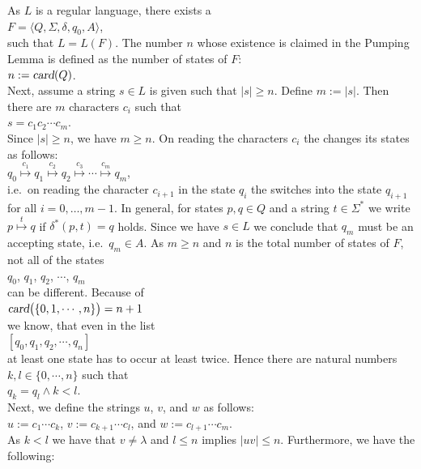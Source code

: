 \proofEng
As $L$ is a regular language, there exists a 
\\[0.2cm]
\hspace*{1.3cm}
$F = \langle Q, \Sigma, \delta, q_0, A \rangle$,
\\[0.2cm]
such that $L = L(F)$.  The number $n$ whose existence is claimed in the Pumping Lemma is defined as
the number of states of $F$: 
\\[0.2cm]
\hspace*{1.3cm}
$n := \textsl{card}(Q)$.
\\[0.2cm]
Next, assume a string $s \in L$ is given such that $|s| \geq n$.  Define $m := |s|$. Then there are $m$
characters $c_i$ such that
\\[0.2cm]
\hspace*{1.3cm}
$s = c_1 c_2 \cdots c_m$.
\\[0.2cm]
Since $|s| \geq n$, we have $m \geq n$.  On reading the characters $c_i$ the  changes its
states as follows:
\\[0.2cm]
\hspace*{1.3cm}
$q_0 \stackrel{c_1}{\longmapsto} q_1 \stackrel{c_2}{\longmapsto} q_2 \stackrel{c_3}{\longmapsto} \cdots \stackrel{c_m}{\longmapsto} q_m$,
\\[0.2cm]
i.e.~on reading the character $c_{i+1}$ in the state $q_i$ the  switches into the state $q_{i+1}$
for all $i=0,\ldots,m-1$.  In general, for states $p, q \in Q$ and a string $t \in \Sigma^*$ we write
$p \stackrel{t}{\longmapsto} q$ if $\delta^*(p, t) = q$ holds.
Since we have  $s \in L$ we conclude that  $q_m$ must be an accepting state, i.e.~$q_m \in A$.
As $m \geq n$ and $n$ is the total number of states of $F$, not all of the states 
\\[0.2cm]
\hspace*{1.3cm}
$q_0$, $q_1$, $q_2$, $\cdots$, $q_m$
\\[0.2cm]
can be different.
Because of
\\[0.2cm]
\hspace*{1.3cm}
$\textsl{card}\bigl(\{0,1,\cdots,n\}\bigr) = n+1$
\\[0.2cm]
we know, that even in the list
\\[0.2cm]
\hspace*{1.3cm}
$[q_0,q_1,q_2,\cdots, q_{n}]$
\\[0.2cm]
at least one state has to occur at least twice.  Hence there are natural numbers $k, l \in \{0,\cdots,n\}$ such that
\\[0.2cm]
\hspace*{1.3cm}
$q_k = q_l \wedge k < l$.
\\[0.2cm]
Next, we define the strings $u$, $v$, and $w$ as follows:
\\[0.2cm]
\hspace*{1.3cm}
$u := c_1 \cdots c_k$, \quad $v := c_{k+1} \cdots c_l$, \quad and \quad $w := c_{l+1} \cdots c_{m}$.
\\[0.2cm]
As $k < l$ we have that $v \not= \lambda$ and $l \leq n$ implies $|uv| \leq n$.
Furthermore, we have the following:

